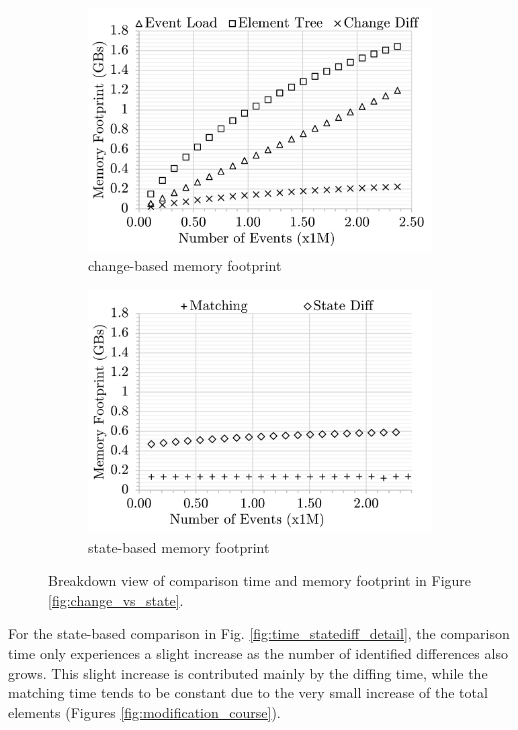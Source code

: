 \documentclass{jot}
\newcommand{\dk}[1]{\textcolor{blue}{\textbf{[Dimitris: #1]}}}
\begin{document}
\begin{figure}[ht]
\begin{subfigure}[t]{0.495\linewidth}
            \includegraphics[width=\linewidth]{mixed-memory-events-detail}
            \caption{change-based memory footprint}
            \label{fig:memory_changediff_detail}
        \end{subfigure}
        \hfill
        \begin{subfigure}[t]{0.495\linewidth}
            \includegraphics[width=\linewidth]{state-memory-events-detail}
            \caption{state-based memory footprint}
            \label{fig:memory_statediff_detail}
        \end{subfigure}
        \caption{Breakdown view of comparison time and memory footprint in Figure \ref{fig:change_vs_state}.}
        \label{fig:time_memory_detail}
    \end{figure}
    
    For the state-based comparison in Fig. \ref{fig:time_statediff_detail}, the comparison time only experiences a slight increase as the number of identified differences also grows.
    This slight increase is contributed mainly by the diffing time, while the matching time tends to be constant due to the very small increase of the total elements (Figures \ref{fig:modification_course}).
    
\end{document}

